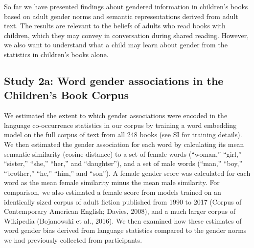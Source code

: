 \documentclass[
  english,
  ,man,floatsintext]{apa6}
\begin{document}
So far we have presented findings about gendered information in children's books based on adult gender norms and semantic representations derived from adult text. The results are relevant to the beliefs of adults who read books with children, which they may convey in conversation during shared reading. However, we also want to understand what a child may learn about gender from the statistics in children's books alone.

\hypertarget{study-2a-word-gender-associations-in-the-childrens-book-corpus}{%
\subsection{Study 2a: Word gender associations in the Children's Book Corpus}\label{study-2a-word-gender-associations-in-the-childrens-book-corpus}}

We estimated the extent to which gender associations were encoded in the language co-occurrence statistics in our corpus by training a word embedding model on the full corpus of text from all 248 books (see SI for training details). We then estimated the gender association for each word by calculating its mean semantic similarity (cosine distance) to a set of female words (\enquote{woman,} \enquote{girl,} \enquote{sister,} \enquote{she,} \enquote{her,} and \enquote{daughter}), and a set of male words (\enquote{man,} \enquote{boy,} \enquote{brother,} \enquote{he,} \enquote{him,} and \enquote{son}). A female gender score was calculated for each word as the mean female similarity minus the mean male similarity. For comparison, we also estimated a female score from models trained on an identically sized corpus of adult fiction published from 1990 to 2017 (Corpus of Contemporary American English; Davies, 2008), and a much larger corpus of Wikipedia (Bojanowski et al., 2016). We then examined how these estimates of word gender bias derived from language statistics compared to the gender norms we had previously collected from participants.
\end{document}

